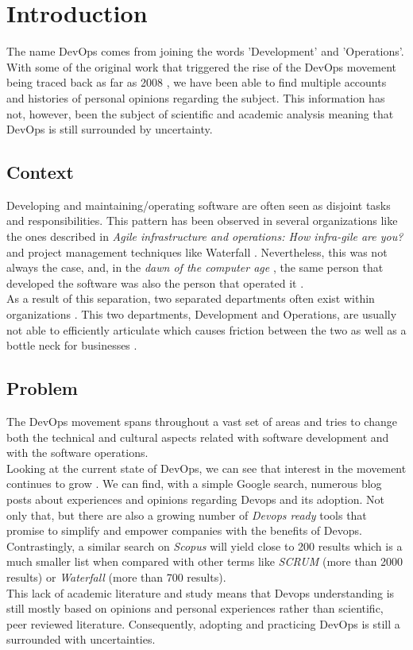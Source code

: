 \chapter{Introduction} \label{chap:introduction}
The name DevOps comes from joining the words 'Development' and 'Operations'. With some of the original work that triggered the rise of the DevOps movement being traced back as far as 2008 \cite{Debois2008}, we have been able to find multiple accounts and histories of personal opinions regarding the subject. This information has not, however, been the subject of scientific and academic analysis meaning that DevOps is still surrounded by uncertainty.

		\section{Context} \label{chap:introduction:sec:context}
		Developing and maintaining/operating software are often seen as disjoint tasks and responsibilities. This pattern has been observed in several organizations like the ones described in \textit{Agile infrastructure and operations: How infra-gile are you?} \cite{Debois2008} and project management techniques like Waterfall \cite{Royce1970}. Nevertheless, this was not always the case, and, in the \textit{dawn of the computer age} , the same person that developed the software was also the person that operated it \cite{Loukides2012}.\\
		As a result of this separation, two separated departments often exist within organizations \cite{Erich2014}. This two departments, Development and Operations, are usually not able to efficiently articulate which causes friction between the two \cite{Erich2014} as well as a bottle neck for businesses \cite{Debois2008}.

		\section{Problem} \label{chap:introduction:sec:problem}

		The DevOps movement spans throughout a vast set of areas and tries to change both the technical and cultural aspects related with software development and with the software operations.\\
		Looking at the current state of DevOps, we can see that interest in the movement continues to grow \cite{syed2016cloud}. We can find, with a simple Google search, numerous blog posts about experiences and opinions regarding Devops and its adoption. Not only that, but there are also a growing number of \textit{Devops ready} tools that promise to simplify and empower companies with the benefits of Devops.\\
		Contrastingly, a similar search on \textit{Scopus} will yield close to 200 results which is a much smaller list when compared with other terms like \textit{SCRUM} (more than 2000 results) or \textit{Waterfall} (more than 700 results).\\
		This lack of academic literature and study means that Devops understanding is still mostly based on opinions and personal experiences rather than scientific, peer reviewed literature. Consequently, adopting and practicing DevOps is still a surrounded with uncertainties.

